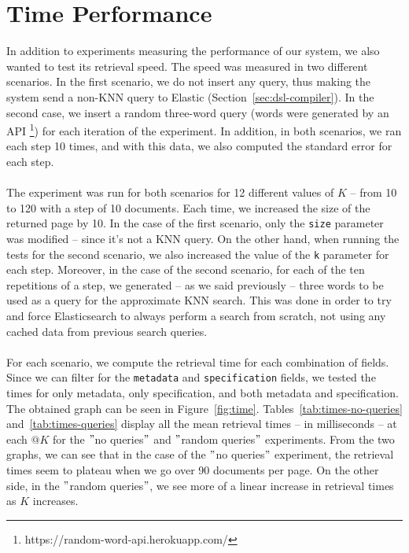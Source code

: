 \section{Time Performance}\label{sec:time-performance}
In addition to experiments measuring the performance of our system, we also wanted to test its retrieval speed.
The speed was measured in two different scenarios.
In the first scenario, we do not insert any query, thus making the system send a non-KNN query to Elastic (Section~\ref{sec:dsl-compiler}).
In the second case, we insert a random three-word query (words were generated by an API \footnote{https://random-word-api.herokuapp.com/
}) for each iteration of the experiment.
In addition, in both scenarios, we ran each step 10 times, and with this data, we also computed the standard error for each step.\\ \\
The experiment was run for both scenarios for 12 different values of $K$ -- from 10 to 120 with a step of 10 documents.
Each time, we increased the size of the returned page by 10.
In the case of the first scenario, only the \verb|size| parameter was modified -- since it's not a KNN query.
On the other hand, when running the tests for the second scenario, we also increased the value of the \verb|k| parameter for each step.
Moreover, in the case of the second scenario, for each of the ten repetitions of a step, we generated -- as we said previously -- three words to be used as a query for the approximate KNN search.
This was done in order to try and force Elasticsearch to always perform a search from scratch, not using any cached data from previous search queries. \\ \\
For each scenario, we compute the retrieval time for each combination of fields.
Since we can filter for the \verb|metadata| and \verb|specification| fields, we tested the times for only metadata, only specification, and both metadata and specification.
The obtained graph can be seen in Figure~\ref{fig:time}.
Tables~\ref{tab:times-no-queries} and~\ref{tab:times-queries} display all the mean retrieval times -- in milliseconds -- at each $@K$ for the \("\)no queries\("\) and \("\)random queries\("\) experiments.
From the two graphs, we can see that in the case of the \("\)no queries\("\) experiment, the retrieval times seem to plateau when we go over 90 documents per page.
On the other side, in the \("\)random queries\("\), we see more of a linear increase in retrieval times as $K$ increases.

